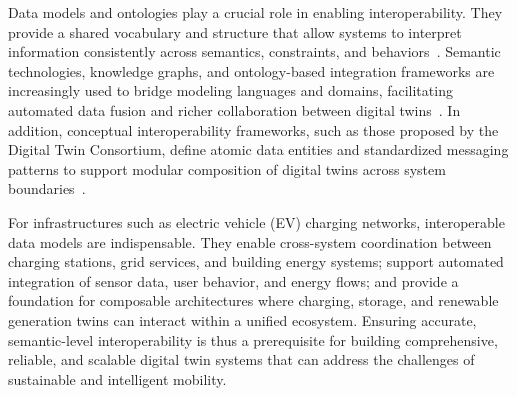 Data models and ontologies play a crucial role in enabling interoperability. They provide a shared vocabulary and structure that allow systems to interpret information consistently across semantics, constraints, and behaviors~\cite{Karabulut2023}. Semantic technologies, knowledge graphs, and ontology-based integration frameworks are increasingly used to bridge modeling languages and domains, facilitating automated data fusion and richer collaboration between digital twins~\cite{Dunbar2022}. In addition, conceptual interoperability frameworks, such as those proposed by the Digital Twin Consortium, define atomic data entities and standardized messaging patterns to support modular composition of digital twins across system boundaries~\cite{Budiardjo2021}.

For infrastructures such as electric vehicle (EV) charging networks, interoperable data models are indispensable. They enable cross-system coordination between charging stations, grid services, and building energy systems; support automated integration of sensor data, user behavior, and energy flows; and provide a foundation for composable architectures where charging, storage, and renewable generation twins can interact within a unified ecosystem. Ensuring accurate, semantic-level interoperability is thus a prerequisite for building comprehensive, reliable, and scalable digital twin systems that can address the challenges of sustainable and intelligent mobility.










